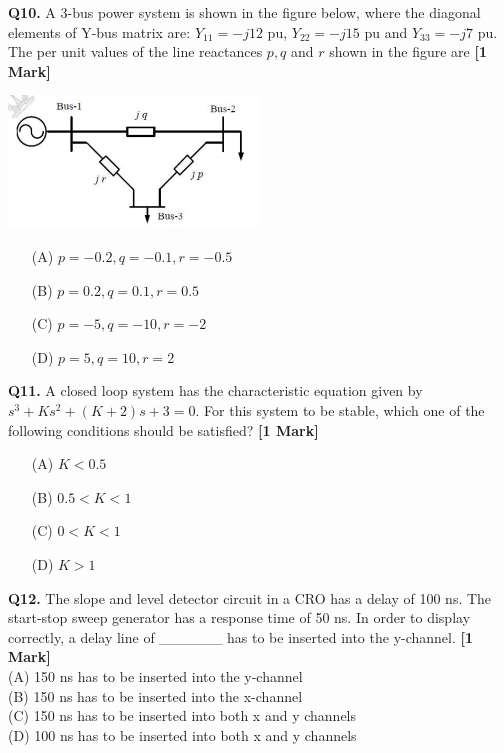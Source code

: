 \documentclass[11pt]{article}
\newcommand{\questiona}[2]{
    \noindent\textbf{Q#2.} #1 \hfill \textbf{[1 Mark]}
}
\begin{document}
\questiona{A 3-bus power system is shown in the figure below, where the diagonal elements of Y-bus matrix are: \( Y_{11} = -j12 \) pu, \( Y_{22} = -j15 \) pu and \( Y_{33} = -j7 \) pu. The per unit values of the line reactances \( p, q \) and \( r \) shown in the figure are}{10}
\begin{center}
\includegraphics[width=0.5\textwidth]{figures/10a.png}
\end{center}
\begin{enumerate}
    \item[(A)] \( p = -0.2, q = -0.1, r = -0.5 \)  
    \item[(B)] \( p = 0.2, q = 0.1, r = 0.5 \)  
    \item[(C)] \( p = -5, q = -10, r = -2 \)  
    \item[(D)] \( p = 5, q = 10, r = 2 \)  
\end{enumerate}
\vspace{0.5cm}

\questiona{A closed loop system has the characteristic equation given by \( s^3 + Ks^2 + (K + 2)s + 3 = 0 \). For this system to be stable, which one of the following conditions should be satisfied?}{11}
\begin{enumerate}
    \item[(A)] \( K < 0.5 \)  
    \item[(B)] \( 0.5 < K < 1 \)  
    \item[(C)] \( 0 < K < 1 \)  
    \item[(D)] \( K > 1 \)  
\end{enumerate}
\vspace{0.5cm}

\questiona{The slope and level detector circuit in a CRO has a delay of 100 ns. The start-stop sweep generator has a response time of 50 ns. In order to display correctly, a delay line of \_\_\_\_\_\_ has to be inserted into the y-channel.}{12}\\
(A) 150 ns has to be inserted into the y-channel\\
(B) 150 ns has to be inserted into the x-channel\\
(C) 150 ns has to be inserted into both x and y channels\\
(D) 100 ns has to be inserted into both x and y channels\\
\vspace{0.5cm}
\end{document}
